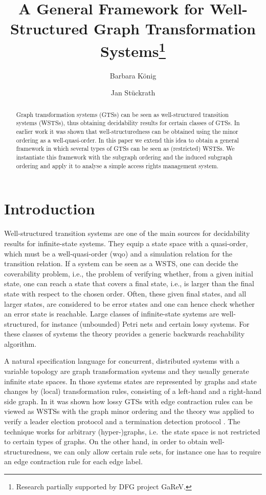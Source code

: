 \documentclass{llncs}
\title{A General Framework for Well-Structured Graph Transformation 
Systems\thanks{Research partially supported by DFG project GaReV.}}
\author{Barbara K\"onig \and Jan St\"uckrath}
\institute{%
  Universit\"at~Duisburg-Essen, Germany\\
  \email{\{barbara\_koenig, jan.stueckrath\}@uni-due.de}}
\begin{document}
\maketitle

\begin{abstract}
  Graph transformation systems (GTSs) can be seen as well-structured
  transition systems (WSTSs), thus obtaining decidability results for
  certain classes of GTSs. In earlier work it was shown that
  well-structuredness can be obtained using the minor ordering as a
  well-quasi-order. In this paper we extend this idea to obtain a
  general framework in which several types of GTSs can be seen as
  (restricted) WSTSs. We instantiate this framework with the subgraph
  ordering and the induced subgraph ordering and apply it to analyse a
  simple access rights management system.
\end{abstract}

\section{Introduction}
\label{sec:introduction}

Well-structured transition systems
\cite{acjt:general-decidability,fs:well-structured-everywhere} are one
of the main sources for decidability results for infinite-state
systems. They equip a state space with a quasi-order, which must be
a well-quasi-order (wqo) and a simulation relation for the transition
relation. If a system can be seen as a WSTS, one can decide the
coverability problem, i.e., the problem of verifying whether, from a
given initial state, one can reach a state that covers a final state,
i.e., is larger than the final state with respect to the chosen order.
Often, these given final states, and all larger states, are considered
to be error states and one can hence check whether an error state is
reachable.
Large classes of infinite-state systems are well-structured, for
instance (unbounded) Petri nets and certain lossy systems. For these
classes of systems the theory provides a generic backwards
reachability algorithm.

A natural specification language for concurrent, distributed systems
with a variable topology are graph transformation systems
\cite{r:gra-handbook} and they usually generate infinite state spaces.
In those systems states are represented by graphs and state changes by
(local) transformation rules, consisting of a left-hand and a
right-hand side graph.
In \cite{JK08} it was shown how lossy GTSs with edge contraction rules
can be viewed as WSTSs with the graph minor ordering
\cite{rs:graph-minors-xx,RS:graphMinors:XXIII} and the theory was
applied to verify a leader election protocol and a termination
detection protocol \cite{bdkss:undecidability-gts}. The technique
works for arbitrary (hyper-)graphs, i.e.\ the state space is not
restricted to certain types of graphs. On the other hand, in order to
obtain well-structuredness, we can only allow certain rule sets, for
instance one has to require an edge contraction rule for each edge
label.
\end{document}
